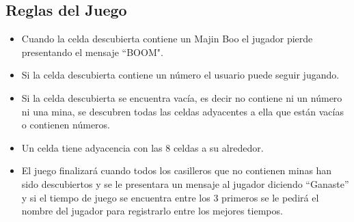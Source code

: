 \documentclass[11pt]{article} %
\begin{document}
\subsection{Reglas del Juego}
\begin{itemize}
\item Cuando la celda descubierta contiene un Majin Boo el jugador pierde  presentando el mensaje ``BOOM".
\item Si la celda descubierta contiene un número el usuario puede seguir jugando.
\item Si la celda descubierta se encuentra vacía, es decir no contiene ni un número ni una mina, se descubren todas las celdas
adyacentes a ella que están vacías o contienen números.
\item Un celda tiene adyacencia con las 8 celdas a su alrededor.
\item El juego finalizará cuando todos los casilleros que no contienen minas han sido descubiertos y se le presentara un mensaje al jugador diciendo “Ganaste” y si el tiempo de juego se encuentra entre los 3 primeros se le pedirá el nombre del jugador para registrarlo entre los mejores tiempos.
\end {itemize}
\end{document}
